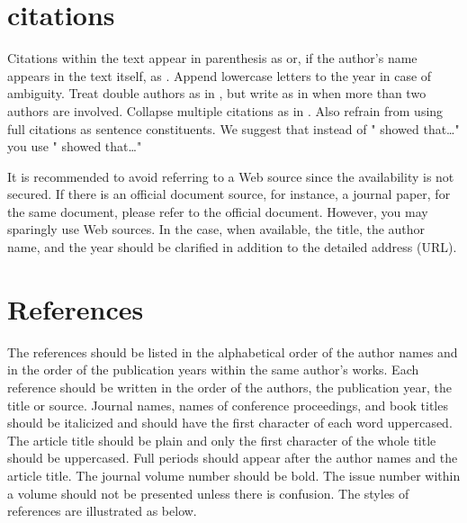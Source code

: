 \documentclass{article}
\begin{document}
\section*{citations}
Citations within the text appear in parenthesis as \parencite{linton_disability_1998} or, if the author’s name appears in the text itself, as \textcite{linton_disability_1998}. Append lowercase letters to the year in case of ambiguity. Treat double authors as in \parencite{sengupta-irving_conceptualizing_2017}, but write as in \parencite{decuyper_grasping_2010} when more than two authors are involved. Collapse multiple citations as in \parencite{linton_disability_1998, sengupta-irving_conceptualizing_2017}. Also refrain from using full citations as sentence constituents. We suggest that instead of
"\parencite{linton_disability_1998} showed that\ldots"
you use
"\textcite{linton_disability_1998} showed that\ldots"


It is recommended to avoid referring to a Web source since the availability is not secured. If there is an official document source, for instance, a journal paper, for the same document, please refer to the official document. However, you may sparingly use Web sources. In the case, when available, the title, the author name, and the year should be clarified in addition to the detailed address (URL). 

\section*{References}
The references should be listed in the alphabetical order of the author names and in the order of the publication years within the same author’s works. Each reference should be written in the order of the authors, the publication year, the title or source. Journal names, names of conference proceedings, and book titles should be italicized and should have the first character of each word uppercased. The article title should be plain and only the first character of the whole title should be uppercased. Full periods should appear after the author names and the article title. The journal volume number should be bold. The issue number within a volume should not be presented unless there is confusion. The styles of references are illustrated as below.
\end{document}
